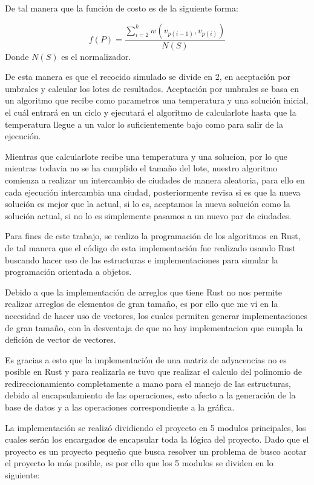 \begin{multicols}{2}
De tal manera que la función de costo es de la siguiente forma:

\[
  f(P) = \frac{\sum^k_{i=2}w(v_{p(i-1)}, v_{p(i)})}{N(S)}
\]
 Donde $N(S)$ es el normalizador. 

 De esta manera es que el recocido simulado se divide en 2, en aceptación por umbrales y calcular los lotes de resultados. Aceptación por umbrales se basa en un algoritmo que recibe como parametros una temperatura y una solución inicial, el cuál entrará en un ciclo y ejecutará el algoritmo de calcularlote hasta que la temperatura llegue a un valor lo suficientemente bajo como para salir de la ejecución.

 Mientras que calcularlote recibe una temperatura y una solucion, por lo que mientras todavia no se ha cumplido el tamaño del lote, nuestro algoritmo comienza a realizar un intercambio de ciudades de manera aleatoria, para ello en cada ejecución intercambia una ciudad, posteriormente revisa si es que la nueva solución es mejor que la actual, si lo es, aceptamos la nueva solución como la solución actual, si no lo es simplemente pasamos a un nuevo par de ciudades.

 Para fines de este trabajo, se realizo la programación de los algoritmos en Rust, de tal manera que el código de esta implementación fue realizado usando Rust buscando hacer uso de las estructuras e implementaciones para simular la programación orientada a objetos.

 Debido a que la implementación de arreglos que tiene Rust no nos permite realizar arreglos de elementos de gran tamaño, es por ello que me vi en la necesidad de hacer uso de vectores, los cuales permiten generar implementaciones de gran tamaño, con la desventaja de que no hay implementacion que cumpla la defición de vector de vectores.

 Es gracias a esto que la implementación de una matriz de adyacencias no es posible en Rust y para realizarla se tuvo que realizar el calculo del polinomio de redireccionamiento completamente a mano para el manejo de las estructuras, debido al encapsulamiento de las operaciones, esto afecto a la generación de la base de datos y a las operaciones correspondiente a la gráfica. 
 
 La implementación se realizó dividiendo el proyecto en 5 modulos principales, los cuales serán los encargados de encapsular toda la lógica del proyecto. Dado que el proyecto es un proyecto pequeño que busca resolver un problema de busco acotar el proyecto lo más posible, es por ello que los 5 modulos se dividen en lo siguiente:


\end{multicols}

